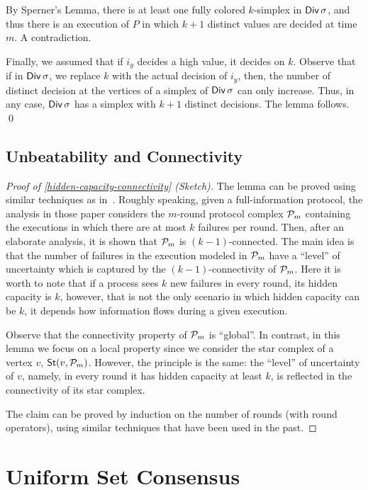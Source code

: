 \documentclass[11pt]{article}
\theoremstyle{definition}
\DeclareMathOperator{\Star}{\sf St}
\DeclareMathOperator{\Div}{\sf Div}
\begin{document}
By Sperner's Lemma, there is at least one fully colored $k$-simplex in $\Div \sigma$,
and thus there is an execution of $P$ in which $k+1$ distinct values are decided at time $m$.
A contradiction.

Finally, we assumed that if
$i_y$ decides a high value, it decides on $k$.
Observe that if in $\Div \sigma$, we replace
$k$ with the actual decision of $i_y$, then,
the number of distinct decision  at the vertices
of a simplex of $\Div \sigma$ can only increase.
Thus, in any case, $\Div \sigma$ has a simplex with
$k+1$ distinct decisions. The lemma follows. \qed

\subsection{
Unbeatability and Connectivity}
\label{sec-discussion-connectivity}

\begin{proof}[Proof of \cref{hidden-capacity-connectivity} (Sketch)]
The lemma can be proved using similar techniques as in~\cite{GHP,HRT98}.
Roughly speaking, given a full-information protocol, the analysis in those paper considers the $m$-round protocol complex ${\cal P}_m$
containing the executions in which there are at most $k$ failures per round.
Then, after an elaborate analysis, it is shown that ${\cal P}_m$ is $(k-1)$-connected.
The main idea is that the number of failures in the execution modeled in ${\cal P}_m$
have a ``level'' of uncertainty which is captured by the $(k-1)$-connectivity of ${\cal P}_m$.
Here it is worth to note that if a process sees $k$ new failures in every round, its
hidden capacity is $k$, however, that is not the only scenario in which hidden capacity
can be $k$, it depends how information flows during a given execution.

Observe that the connectivity property of ${\cal P}_m$ is ``global''.
In contrast, in this lemma we focus on a local property since we consider the star complex
of a vertex $v$, $\Star(v, {\cal P}_m)$. However, the principle is the same: the ``level'' of uncertainty of $v$,
namely, in every round it has hidden capacity at least $k$, is reflected in the connectivity
of its star complex.

The claim can be proved by induction on the number of rounds (with round operators),
using similar techniques that have been used in the past.
\end{proof}

\section{Uniform Set Consensus}
\label{sec-uni-set-cons-proofs}
\end{document}
